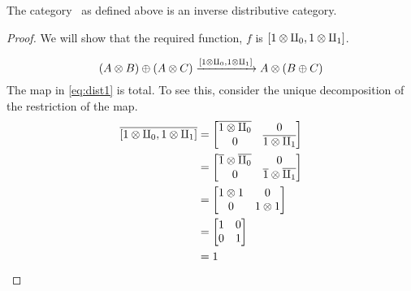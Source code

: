 \begin{lemma}
  The category \X\ as defined above is an inverse distributive category.
\end{lemma}
\begin{proof}
  We will show that the required function, $f$ is $[1\otimes \amalg_{0}, 1\otimes \amalg_{1}]$.

  \begin{equation}
    (A\otimes B) \oplus (A \otimes C) \xrightarrow{[1\otimes \amalg_{0}, 1\otimes \amalg_{1}]} A \otimes (B \oplus C) \label{eq:dist1}
  \end{equation}
  The map in \ref{eq:dist1} is total. To see this, consider the unique decomposition of the
  restriction of the map.
  \begin{align*}
    \overline{[1\otimes \amalg_{0}, 1\otimes \amalg_{1}]} &=
    \begin{bmatrix}
      \overline{1\otimes \amalg_{0}} & 0 \\
      0 & \overline{1\otimes \amalg_{1}}
    \end{bmatrix}\\
    &=
    \begin{bmatrix}
      \overline{1}\otimes \overline{\amalg_{0}} & 0 \\
      0 & \overline{1}\otimes \overline{\amalg_{1}}
    \end{bmatrix}\\
    &=
    \begin{bmatrix}
      1\otimes 1 & 0 \\
      0 & 1\otimes 1
    \end{bmatrix}\\
    &=
    \begin{bmatrix}
      1 & 0 \\
      0 & 1
    \end{bmatrix}\\
    &=1
  \end{align*}
\end{proof}
